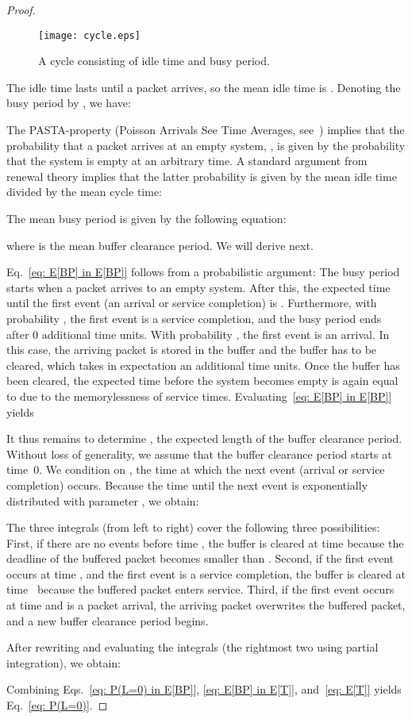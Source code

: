 \documentclass[preprint,12pt]{elsarticle}
\theoremstyle{definition}
\theoremstyle{plain}
\theoremstyle{remark}
\begin{document}
\begin{proof}
\begin{figure}[t]
\begin{center}
  \texttt{[image: cycle.eps]}
\caption{A cycle consisting of idle time and busy period.}
  \label{fig:cycle}
\end{center}
\end{figure}


\smallskip
  The idle time lasts until a packet arrives, so the mean idle time is . Denoting the busy period by , we have:
  

  The PASTA-property (Poisson Arrivals See Time Averages, see~\cite{wolff_poisson_1982}) implies that the probability that a packet arrives at an empty system, , is given by the probability that the system is empty at an arbitrary time. A standard argument from renewal theory implies that the latter probability is given by the mean idle time divided by the mean cycle time:
  
The mean busy period is given by the following equation:
  
  where  is the mean buffer clearance period. We will derive  next.

  Eq.~\eqref{eq: E[BP] in E[BP]} follows from a probabilistic argument: The busy period starts when a packet arrives to an empty system. After this, the expected time until the first event (an arrival or service completion) is . Furthermore, with probability , the first event is a service completion, and the busy period ends after 0 additional time units. With probability , the first event is an arrival. In this case, the arriving packet is stored in the buffer and the buffer has to be cleared, which takes in expectation an additional  time units. Once the buffer has been cleared, the expected time before the system becomes empty is again equal to  due to the memorylessness of service times. Evaluating~\eqref{eq: E[BP] in E[BP]} yields
  

  It thus remains to determine , the expected length of the buffer clearance period. Without loss of generality, we assume that the buffer clearance period starts at time~0. We condition on , the time at which the next event (arrival or service completion) occurs. Because the time until the next event is exponentially distributed with parameter , we obtain:
  
  The three integrals (from left to right) cover the following three possibilities: First, if there are no events before time , the buffer is cleared at time  because the deadline of the buffered packet becomes smaller than . Second, if the first event occurs at time , and the first event is a service completion, the buffer is cleared at time~ because the buffered packet enters service. Third, if the first event occurs at time  and is a packet arrival, the arriving packet overwrites the buffered packet, and a new buffer clearance period begins.

  After rewriting and evaluating the integrals (the rightmost two using partial integration), we obtain:
  
  Combining Eqs.~\eqref{eq: P(L=0) in E[BP]}, \eqref{eq: E[BP] in E[T]}, and~\eqref{eq: E[T]} yields Eq.~\eqref{eq: P(L=0)}.
\end{proof}
\end{document}
